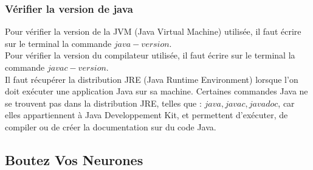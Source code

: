 \documentclass[a4paper,11pts]{article}
\begin{document}
\subsubsection{Vérifier la version de java}
\indent Pour vérifier la version de la JVM (Java Virtual Machine) utilisée, il faut écrire sur le terminal la commande $java -version$.\\
Pour vérifier la version du compilateur utilisée, il faut écrire sur le terminal la commande $javac -version$.\\
Il faut récupérer la distribution JRE (Java Runtime Environment) lorsque l'on doit exécuter une application Java sur sa machine.
Certaines commandes Java ne se trouvent pas dans la distribution JRE, telles que : $java, javac, javadoc$, car elles appartiennent à Java Developpement Kit, et permettent d'exécuter, de compiler ou de créer la documentation sur du code Java.

\subsection {Boutez Vos Neurones}
\end{document}
